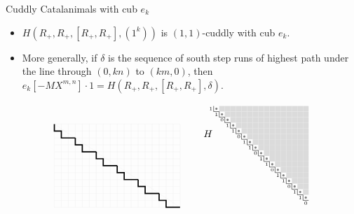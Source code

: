 \documentclass{beamer}
\newcounter{c}
\begin{document}
\begin{frame}{Cuddly Catalanimals with cub \(e_k\)}
  \begin{itemize}
  \item \(H(R_+,R_+,[R_+,R_+],(1^k))\) is \((1,1)\)-cuddly with cub \(e_k\).\pause
  \item More generally, if \(\delta\) is the sequence of south step
    runs of highest path under the line through \((0,kn)\) to
    \((km,0)\), then \(e_k[-MX^{m,n}] \cdot 1 = H(R_+,R_+,[R_+,R_+],\delta)\).\pause
  \end{itemize}
  \[
  \begin{array}{c@{\quad\quad}cr}
  \begin{tikzpicture}[scale=0.25]
      \draw[step=1cm,gray!20,very thin] (0,0) grid (18,12);
      \draw[step=1cm,gray!20,very thin] (0,12)--(18,0);
      \foreach \off in {0,1,2,3,4,5} {
      \draw[very thick] (0+3*\off,12-2*\off)--(0+3*\off,11-2*\off)--(1+3*\off,11-2*\off)--(1+3*\off,10-2*\off)--(3+3*\off,10-2*\off);
      }
    \end{tikzpicture}
    &
      \begin{tikzpicture}[scale=0.2]
        \foreach \j in {1,...,17} {
          \draw[draw = none, fill = gray!100] (\j+0.5, -\j-0.5) circle (.2);
        }
        \foreach \j in {1,...,16} {
          \pgfmathsetmacro{\z}{\j+1}
          \foreach \i in {\z,...,17} {
            \draw[draw = none, fill = black!14] (\i,-\j) rectangle (\i+1,-\j-1);
          }
        }
        \draw[thin] (1,-1) -- (1,-2);
        \foreach \j in {2,...,17} {
          \draw[thin] (\j-1,-\j) -- (\j,-\j);
          \draw[thin] (\j,-\j) -- (\j,-\j-1);
        }
        \draw[thin] (17,-18) -- (18,-18);
        \foreach \j in {0,...,5} {
          \node at (3*\j+0.5,-3*\j-1.5) {\tiny \(1\)};
          \node at (3*\j+1.5,-3*\j-2.5) {\tiny \(1\)};
          \node at (3*\j+2.5,-3*\j-3.5) {\tiny \(0\)};
        }
        \node at (0,-6) {\(H\)};
      \end{tikzpicture}
      

\end{array}\]
\end{frame}
\end{document}
